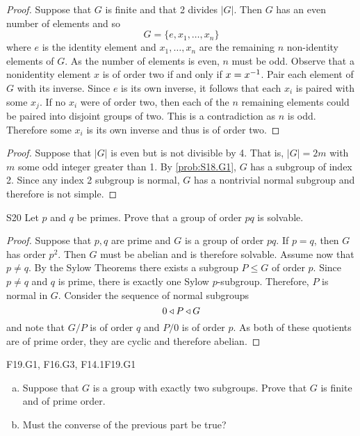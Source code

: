 \documentclass[../AlgebraQualSolutions.tex]{subfiles}
\begin{document}
	\begin{proof}
	Suppose that $G$ is finite and that 2 divides $|G|$. Then $G$ has an even number of elements and so
		\[G = \{e, x_1, \ldots, x_n\}\]
	where $e$ is the identity element and $x_1, \ldots, x_n$ are the remaining $n$ non-identity elements of $G$. As the number of elements is even, $n$ must be odd. Observe that a nonidentity element $x$ is of order two if and only if $x = x^{-1}$. Pair each element of $G$ with its inverse. Since $e$ is its own inverse, it follows that each $x_i$ is paired with some $x_j$. If no $x_i$ were of order two, then each of the $n$ remaining elements could be paired into disjoint groups of two. This is a contradiction as $n$ is odd. Therefore some $x_i$ is its own inverse and thus is of order two. 
	\end{proof}
	
	\begin{proof}
	Suppose that $|G|$ is even but is not divisible by 4. That is, $|G| = 2m$ with $m$ some odd integer greater than 1. By \ref{prob:S18.G1}, $G$ has a subgroup of index 2. Since any index 2 subgroup is normal, $G$ has a nontrivial normal subgroup and therefore is not simple.
	\end{proof}
	
	\begin{prob}{S20}{}
	Let $p$ and $q$ be primes. Prove that a group of order $pq$ is solvable.
	\end{prob}
	
	\begin{proof}
	Suppose that $p,q$ are prime and $G$ is a group of order $pq$. If $p = q$, then $G$ has order $p^2$. Then $G$ must be abelian and is therefore solvable. Assume now that $p \neq q$. By the Sylow Theorems there exists a subgroup $P \leq G$ of order $p$. Since $p \neq q$ and $q$ is prime, there is exactly one Sylow $p$-subgroup. Therefore, $P$ is normal in $G$. Consider the sequence of normal subgroups
		\[0 \triangleleft P \triangleleft G \]
	and note that $G/P$ is of order $q$ and $P/0$ is of order $p$. As both of these quotients are of prime order, they are cyclic and therefore abelian. 
	\end{proof}
	
	\begin{prob}{F19.G1, F16.G3, F14.1}{F19.G1}
	\begin{enumerate}[(a)]
	\item Suppose that $G$ is a group with exactly two subgroups. Prove that $G$ is finite and of prime order.
	\item Must the converse of the previous part be true?
	\end{enumerate}
	\end{prob}
	
\end{document}
